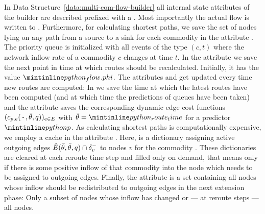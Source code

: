 In Data Structure~\ref{data:multi-com-flow-builder} all internal state attributes of the builder are described prefixed with a \code{_}.
Most importantly the actual flow is written to .
Furthermore, for calculating shortest paths, we save the set of nodes lying on any path from a source to a sink for each commodity in the attribute . 
The priority queue  is initialized with all events of the type $(c, t)$ where the network inflow rate of a commodity $c$ changes at time $t$.
In the attribute  we save the next point in time at which routes should be recalculated.
Initially, it has the value $\code{_flow.phi}$.
The attributes  and  get updated every time new routes are computed:
In  we save the time at which the latest routes have been computed (and at which time the predictions of queues have been taken) and the attribute  saves the corresponding dynamic edge cost functions $(c_{p,e}(\,\boldsymbol{\cdot}\,, \bar\theta, q))_{e\in E}$ with $\bar\theta = \code{_route_time}$ for a predictor $\code{p}$.
As calculating shortest paths is computationally expensive, we employ a cache in the attribute .
Here,  is a dictionary assigning active outgoing edges $\hat E(\bar\theta, \bar\theta, q)\cap \delta^-_{v}$ to nodes $v$ for the commodity .
These dictionaries are cleared at each reroute time step and filled only on demand, that means only if there is some positive inflow of that commodity into the node which needs to be assigned to outgoing edges.
Finally, the attribute  is a set containing all nodes whose inflow should be redistributed to outgoing edges in the next extension phase: Only a subset of nodes whose inflow has changed or — at reroute steps — all nodes.
 
